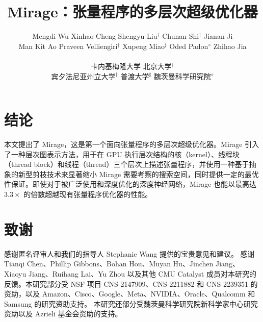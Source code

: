 \documentclass[letterpaper,twocolumn,10pt]{article}
\theoremstyle{definition}
\newcommand{\sys}{Mirage\xspace}
\begin{document}
\title{\sys：张量程序的多层次超级优化器}
\author{\rm{Mengdi Wu} \hspace{1.2em} \rm{Xinhao Cheng} \hspace{1.2em} Shengyu Liu$^{\dag}$ \hspace{1.2em} Chunan Shi$^\dag$ \hspace{1.2em} Jianan Ji\\
 \rm{Man Kit Ao} \hspace{1.2em} Praveen Velliengiri$^{\ddag}$ \hspace{1.2em} Xupeng Miao$^{\sharp}$ \hspace{1.2em} Oded Padon$^{\diamond}$ \hspace{1.2em} Zhihao Jia \\
\\
卡内基梅隆大学 \hspace{1.2em} 北京大学$^\dag$ \\
宾夕法尼亚州立大学$^\ddag$ \hspace{1.2em} 普渡大学$^{\sharp}$ \hspace{1.2em} 魏茨曼科学研究院$^{\diamond}$
}
\maketitle

\pagestyle{empty}












\section{结论}
\label{sec:conclusion}
本文提出了 \sys，这是第一个面向张量程序的多层次超级优化器。\sys 引入了一种层次图表示方法，用于在 GPU 执行层次结构的核（kernel）、线程块（thread block）和线程（thread）三个层次上描述张量程序，并使用一种基于抽象的新型剪枝技术来显著缩小 \sys 需要考察的搜索空间，同时提供一定的最优性保证。即使对于被广泛使用和深度优化的深度神经网络，\sys 也能以最高达 $3.3\times$ 的倍数超越现有张量程序优化器的性能。

\section*{致谢}
感谢匿名评审人和我们的指导人 Stephanie Wang 提供的宝贵意见和建议。
感谢 Tianqi Chen、Phillip Gibbons、Bohan Hou、Muyan Hu、Jinchen Jiang、Xiaoyu Jiang、Ruihang Lai、Yu Zhou 以及其他 CMU Catalyst 成员对本研究的反馈。本研究部分受 NSF 项目 CNS-2147909、CNS-2211882 和 CNS-2239351 的资助，以及 Amazon、Cisco、Google、Meta、NVIDIA、Oracle、Qualcomm 和 Samsung 的研究资助支持。
本研究还部分受魏茨曼科学研究院新科学家中心研究资助以及 Azrieli 基金会资助的支持。

\balance


\end{document}
